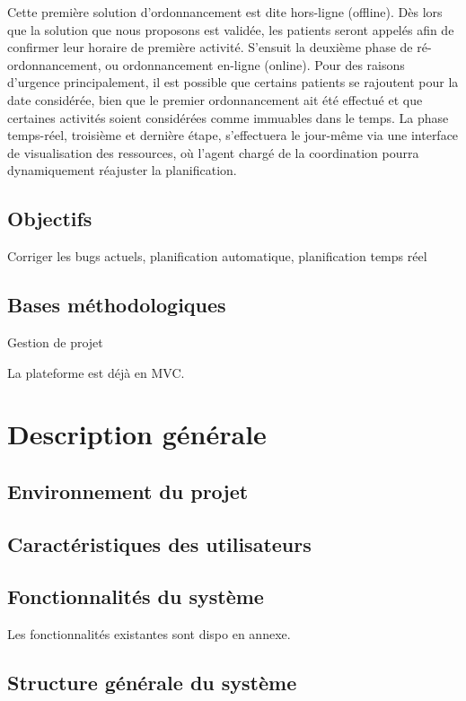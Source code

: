 \documentclass{polytech/polytech}
\begin{document}
Cette première solution d'ordonnancement est dite hors-ligne (offline). Dès lors que la solution que nous proposons est validée, les patients seront appelés afin de confirmer leur horaire de première activité. S'ensuit la deuxième phase de ré-ordonnancement, ou ordonnancement en-ligne (online). Pour des raisons d'urgence principalement, il est possible que certains patients se rajoutent pour la date considérée, bien que le premier ordonnancement ait été effectué et que certaines activités soient considérées comme immuables dans le temps. La phase temps-réel, troisième et dernière étape, s'effectuera le jour-même via une interface de visualisation des ressources, où l'agent chargé de la coordination pourra dynamiquement réajuster la planification.


\section{Objectifs}


Corriger les bugs actuels, planification automatique, planification temps réel


\section{Bases méthodologiques}


Gestion de projet


La plateforme est déjà en MVC.


\chapter{Description générale}


\section{Environnement du projet}

\section{Caractéristiques des utilisateurs}

\section{Fonctionnalités du système}


Les fonctionnalités existantes sont dispo en annexe.



\section{Structure générale du système}
\end{document}
